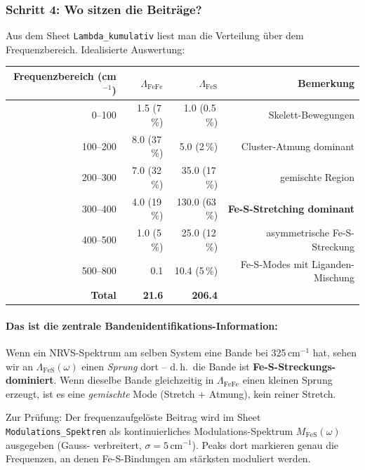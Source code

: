 \documentclass[11pt,a4paper,twoside]{article}
\theoremstyle{remark}
\begin{document}
\subsubsection*{Schritt 4: Wo sitzen die Beitr\"age?}

Aus dem Sheet \texttt{Lambda\_kumulativ} liest man die Verteilung
\"uber dem Frequenzbereich. Idealisierte Auswertung:

\begin{center}
\begin{tabular}{rrrr}
  \toprule
  \textbf{Frequenzbereich (cm$^{-1}$)} & $\Lambda_\text{FeFe}$ & $\Lambda_\text{FeS}$ & \textbf{Bemerkung} \\
  \midrule
  0--100   & 1.5 (7\,\%) & 1.0 (0.5\,\%) & Skelett-Bewegungen \\
  100--200 & 8.0 (37\,\%) & 5.0 (2\,\%)  & Cluster-Atmung dominant \\
  200--300 & 7.0 (32\,\%) & 35.0 (17\,\%) & gemischte Region \\
  300--400 & 4.0 (19\,\%) & 130.0 (63\,\%) & \textbf{Fe-S-Stretching dominant} \\
  400--500 & 1.0 (5\,\%) & 25.0 (12\,\%) & asymmetrische Fe-S-Streckung \\
  500--800 & 0.1         & 10.4 (5\,\%)   & Fe-S-Modes mit Liganden-Mischung \\
  \midrule
  \textbf{Total} & \textbf{21.6} & \textbf{206.4} & \\
  \bottomrule
\end{tabular}
\end{center}

\paragraph{Das ist die zentrale Bandenidentifikations-Information:}
Wenn ein NRVS-Spektrum am selben System eine Bande bei
325\,cm$^{-1}$ hat, sehen wir an
$\Lambda_\text{FeS}(\omega)$ einen \emph{Sprung} dort -- d.\,h.\ die
Bande ist \textbf{Fe-S-Streckungs-dominiert}. Wenn dieselbe Bande
gleichzeitig in $\Lambda_\text{FeFe}$ einen kleinen Sprung erzeugt,
ist es eine \emph{gemischte} Mode (Stretch + Atmung), kein reiner
Stretch.

Zur Pr\"ufung: Der frequenzaufgel\"oste Beitrag wird im Sheet
\texttt{Modulations\_Spektren} als kontinuierliches
Modulations-Spektrum $M_\text{FeS}(\omega)$ ausgegeben (Gauss-
verbreitert, $\sigma = 5\,$cm$^{-1}$). Peaks dort markieren genau
die Frequenzen, an denen Fe-S-Bindungen am st\"arksten moduliert
werden.
\end{document}
